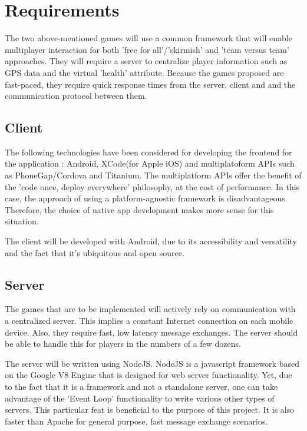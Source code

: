 \documentclass{article}
\begin{document}
\section{Requirements}

The two above-mentioned games will use a common framework that will enable
multiplayer interaction for both 'free for all'/'skirmish' and 'team versus team'
approaches. They will require a server to centralize player information such as
GPS data and the virtual 'health' attribute. Because the games proposed are
fast-paced, they require quick response times from the server, client and and
the communication protocol between them.

\subsection{Client}
The following technologies have been considered for developing the frontend for
the application : Android, XCode(for Apple iOS) and multiplatoform APIs such as
PhoneGap/Cordova and Titanium. The multiplatform APIs offer the benefit of
the 'code once, deploy everywhere' philosophy, at the cost of
performance\cite{nativevscrossplatform}\cite{nativevscrossplatform2}\cite{nativevscrossplatform3}.
In this case, the approach of using a platform-agnostic framework is
disadvantageous. Therefore, the choice of native app development makes more
sense for this situation.\newline

The client will be developed with Android, due to its accessibility and
versatility and the fact that it's ubiquitous and open source.\newline

\subsection{Server}
The games that are to be implemented will actively rely on communication with a
centralized server. This implies a constant Internet connection on each mobile
device. Also, they require fast, low latency message exchanges. The server
should be able to handle this for players in the numbers of a few
dozens.\newline

The server will be written using NodeJS\cite{nodejs}. NodeJS is a javascript
framework based on the Google V8 Engine that is designed for web server
functionality. Yet, due to the fact that it is a framework and not a standalone
server, one can take advantage of the 'Event Loop' functionality to write
various other types of servers. This particular feat is beneficial to the
purpose of this project. It is also faster than Apache for general purpose, fast
message exchange scenarios\cite{nodejsvsapache}.
\end{document}
